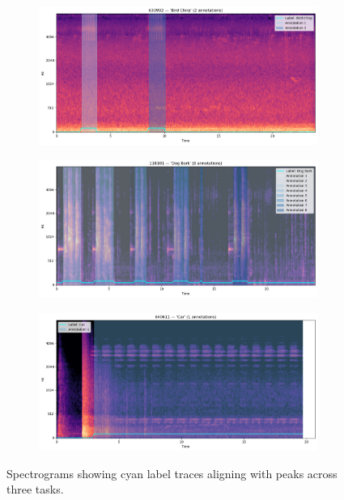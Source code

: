 \documentclass{article}
\begin{document}
\begin{figure}[ht]
    \centering
    \small
    \begin{subfigure}[b]{0.32\textwidth}
        \centering
        \includegraphics[width=\textwidth]{figures/task1.1.png}
        \label{fig:task1_1}
    \end{subfigure}
    \hfill
    \begin{subfigure}[b]{0.32\textwidth}
        \centering
        \includegraphics[width=\textwidth]{figures/task1.2.png}
        \label{fig:task1_2}
    \end{subfigure}
    \hfill
    \begin{subfigure}[b]{0.32\textwidth}
        \centering
        \includegraphics[width=\textwidth]{figures/task1.3.png}
        \label{fig:task1_3}
    \end{subfigure}
    \caption{Spectrograms showing cyan label traces aligning with peaks across three tasks.}
    \label{fig:Task1_A}
\end{figure}
\end{document}
